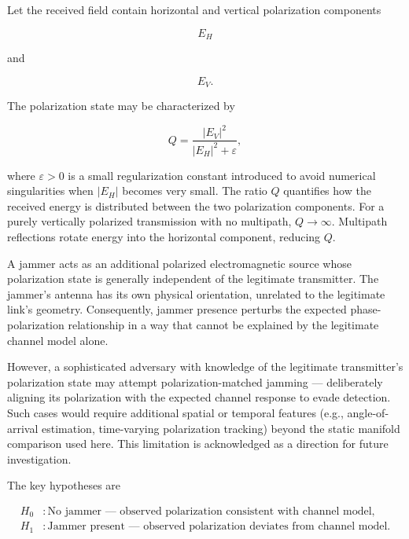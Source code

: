 \documentclass{article}
\begin{document}
Let the received field contain horizontal and vertical polarization components

\begin{equation}
E_H
\end{equation}

and

\begin{equation}
E_V.
\end{equation}

The polarization state may be characterized by

\begin{equation}
Q=
\frac{|E_V|^2}
{|E_H|^2+\varepsilon},
\end{equation}

where $\varepsilon>0$ is a small regularization constant introduced to avoid numerical singularities when $|E_H|$ becomes very small. The ratio $Q$ quantifies how the received energy is distributed between the two polarization components. For a purely vertically polarized transmission with no multipath, $Q \rightarrow \infty$. Multipath reflections rotate energy into the horizontal component, reducing $Q$.

A jammer acts as an additional polarized electromagnetic source whose polarization state is generally independent of the legitimate transmitter. The jammer's antenna has its own physical orientation, unrelated to the legitimate link's geometry. Consequently, jammer presence perturbs the expected phase-polarization relationship in a way that cannot be explained by the legitimate channel model alone.

However, a sophisticated adversary with knowledge of the legitimate transmitter's polarization state may attempt polarization-matched jamming — deliberately aligning its polarization with the expected channel response to evade detection. Such cases would require additional spatial or temporal features (e.g., angle-of-arrival estimation, time-varying polarization tracking) beyond the static manifold comparison used here. This limitation is acknowledged as a direction for future investigation.

The key hypotheses are

\begin{align}
H_0 &: \text{No jammer — observed polarization consistent with channel model},\\
H_1 &: \text{Jammer present — observed polarization deviates from channel model}.
\end{align}
\end{document}
